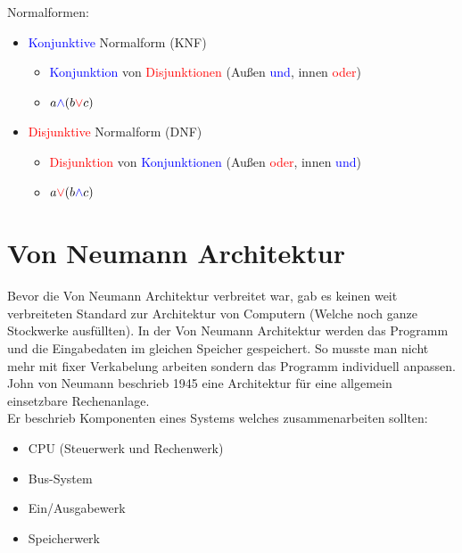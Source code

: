 \documentclass{article}
\begin{document}
		Normalformen:
		\begin{itemize}
			\item{\textcolor{blue}{Konjunktive} Normalform (KNF)}
			\begin{itemize}
				\item{\textcolor{blue}{Konjunktion} von \textcolor{red}{Disjunktionen} (Außen \textcolor{blue}{und}, innen \textcolor{red}{oder})}
				\item{$a\textcolor{blue}{\land} (b\textcolor{red}{\lor} c)$}
			\end{itemize}
			\item{\textcolor{red}{Disjunktive} Normalform (DNF)}
			\begin{itemize}
				\item{\textcolor{red}{Disjunktion} von \textcolor{blue}{Konjunktionen} (Außen \textcolor{red}{oder}, innen \textcolor{blue}{und})}
				\item{$a\textcolor{red}{\lor} (b\textcolor{blue}{\land} c)$}
			\end{itemize}
		\end{itemize}
		\newpage
		\section{Von Neumann Architektur}
		Bevor die Von Neumann Architektur verbreitet war, gab es keinen weit verbreiteten Standard zur Architektur von Computern (Welche noch ganze Stockwerke ausfüllten). In der Von Neumann Architektur werden das Programm und die Eingabedaten im gleichen Speicher gespeichert. So musste man nicht mehr mit fixer Verkabelung arbeiten sondern das Programm individuell anpassen. \\
		John von Neumann beschrieb 1945 eine Architektur für eine allgemein einsetzbare Rechenanlage. \\
		Er beschrieb Komponenten eines Systems welches zusammenarbeiten sollten:
		\begin{itemize}
			\item{CPU (Steuerwerk und Rechenwerk)}
			\item{Bus-System}
			\item{Ein/Ausgabewerk}
			\item{Speicherwerk}
		\end{itemize}
\end{document}
